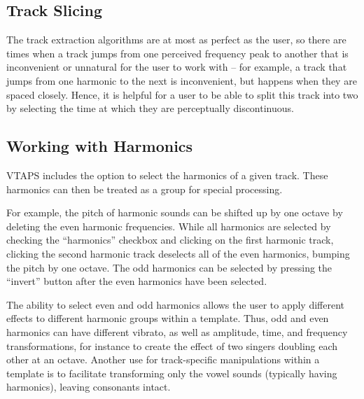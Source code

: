\documentclass{article}
\begin{document}
\subsection{Track Slicing}

The track extraction algorithms are at most as perfect as the user, so there
are times when a track jumps from one perceived frequency peak to another that
is inconvenient or unnatural for the user to work with -- for example, a track
that jumps from one harmonic to the next is inconvenient, but happens when they
are spaced closely.  Hence, it is helpful for a user to be able to split this track into two by
selecting the time at which they are perceptually discontinuous.

\subsection{\label{sub:pitch-shifting}Working with Harmonics}

VTAPS includes the option to select the harmonics of a given track. These 
harmonics can then be treated as a group for special processing. 

For example, the pitch of harmonic sounds can be shifted up by one octave by deleting the
even harmonic frequencies. While all harmonics are selected by checking the
``harmonics'' checkbox and clicking on the first harmonic track, clicking the
second harmonic track deselects all of the even harmonics, bumping the
pitch by one octave.
The odd harmonics can be selected by pressing the ``invert'' button after the
even harmonics have been selected.

The ability to select even and odd harmonics allows the user to apply different 
effects to different harmonic groups within a template. Thus, odd and  even harmonics 
can have different vibrato, as well as amplitude, time, and frequency transformations, 
for instance to create the effect of two singers doubling each other at an octave. 
Another use for track-specific manipulations within a template is to  
facilitate transforming only the vowel sounds (typically having harmonics), leaving 
consonants intact. 

%
%
\end{document}
